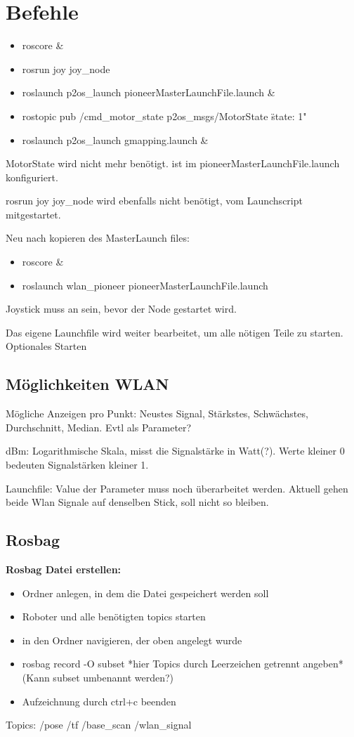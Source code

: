 \documentclass{scrartcl}%
\begin{document}
\section{Befehle}

\begin{itemize}
	\item roscore \&
	\item rosrun joy joy\_node
	\item roslaunch p2os\_launch pioneerMasterLaunchFile.launch \&
	\item rostopic pub /cmd\_motor\_state p2os\_msgs/MotorState \"state: 1"
	\item roslaunch p2os\_launch gmapping.launch \&
\end{itemize}
MotorState wird nicht mehr benötigt. ist im pioneerMasterLaunchFile.launch konfiguriert.

rosrun joy joy\_node wird ebenfalls nicht benötigt, vom Launchscript mitgestartet.

Neu nach kopieren des MasterLaunch files:
\begin{itemize}
	\item roscore \&
	\item roslaunch wlan\_pioneer pioneerMasterLaunchFile.launch
\end{itemize}
Joystick muss an sein, bevor der Node gestartet wird.

Das eigene Launchfile wird weiter bearbeitet, um alle nötigen Teile zu starten. Optionales Starten 

\subsection{Möglichkeiten WLAN}
Mögliche Anzeigen pro Punkt: Neustes Signal, Stärkstes, Schwächstes, Durchschnitt, Median. Evtl als Parameter?

dBm: Logarithmische Skala, misst die Signalstärke in Watt(?). Werte kleiner 0 bedeuten Signalstärken kleiner 1.

Launchfile: Value der Parameter muss noch überarbeitet werden. Aktuell gehen beide Wlan Signale auf denselben Stick, soll nicht so bleiben.

\subsection{Rosbag}
\textbf{Rosbag Datei erstellen:}
\begin{itemize}
	\item Ordner anlegen, in dem die Datei gespeichert werden soll
	\item Roboter und alle benötigten topics starten
	\item in den Ordner navigieren, der oben angelegt wurde
	\item rosbag record -O subset *hier Topics durch Leerzeichen getrennt angeben* (Kann subset umbenannt werden?)
	\item Aufzeichnung durch ctrl+c beenden
\end{itemize}
Topics: /pose /tf /base\_scan /wlan\_signal
\end{document}
